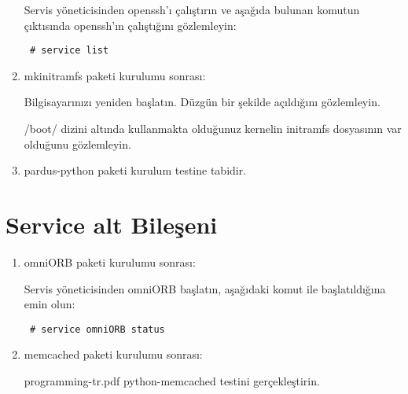 \documentclass[a4paper,10pt]{article}
\begin{document}
\begin{enumerate}
Servis yöneticisinden openssh'ı çalıştırın ve aşağıda bulunan komutun çıktısında openssh'ın çalıştığını gözlemleyin:
\begin{verbatim}
 # service list 
\end{verbatim}

\item mkinitramfs paketi kurulumu sonrası:

Bilgisayarınızı yeniden başlatın. Düzgün bir şekilde açıldığını gözlemleyin.

/boot/ dizini altında kullanmakta olduğunuz kernelin initramfs dosyasının var olduğunu gözlemleyin.

\item pardus-python paketi kurulum testine tabidir.

\end{enumerate}
\section{Service alt Bileşeni}
\begin{enumerate}
\item omniORB paketi kurulumu sonrası:

Servis yöneticisinden omniORB başlatın, aşağıdaki komut ile başlatıldığına emin olun:
\begin{verbatim}
 # service omniORB status
\end{verbatim}

 \item memcached paketi kurulumu sonrası:

  programming-tr.pdf python-memcached testini gerçekleştirin. 
\end{enumerate}
\end{document}

